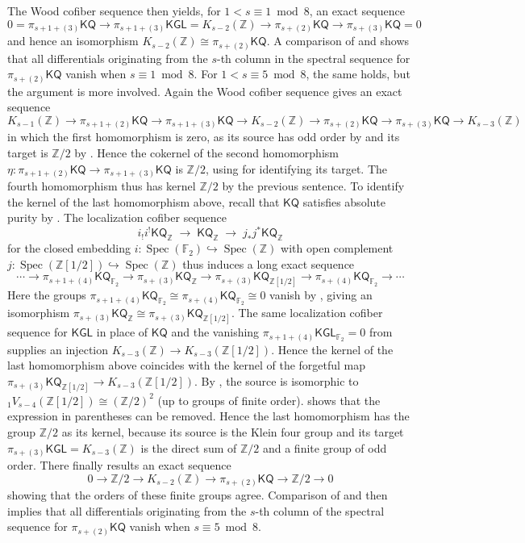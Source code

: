\documentclass[11pt,hyp,english]{article}
\newcommand{\Z}{\mathbb{Z}}
\newcommand{\FF}{\mathbb{F}}
\newcommand{\KGL}{\mathsf{KGL}}
\newcommand{\KQ}{\mathsf{KQ}}
\newcommand{\Spec}{\operatorname{Spec}}
\let\iso=\cong
\theoremstyle{definition}
\begin{document}
The Wood cofiber sequence then yields, for $1 < s \equiv 1 \bmod 8$, an exact sequence
\[
0 = \pi_{s+1+(3)} \KQ \longrightarrow \pi_{s+1+(3)} \KGL = K_{s-2}(\Z) \longrightarrow \pi_{s+(2)} \KQ \longrightarrow \pi_{s+(3)} \KQ = 0
\]
and hence an isomorphism
$K_{s-2}(\Z) \cong \pi_{s+(2)} \KQ$.
A comparison of  and  shows that all differentials originating from the $s$-th column in the spectral sequence for $\pi_{s+(2)} \KQ$ vanish when $s \equiv 1 \bmod 8$.
For $1 < s \equiv 5 \bmod 8$, the same holds, but the argument is more involved.
Again the Wood cofiber sequence gives an exact sequence
\[
K_{s-1}(\Z) \to \pi_{s+1+(2)}\KQ \to \pi_{s+1+(3)}\KQ \to K_{s-2}(\Z) \to \pi_{s+(2)}\KQ \to \pi_{s+(3)}\KQ \to K_{s-3}(\Z)
\]
in which the first homomorphism is zero, as its source has odd order by  and its target is $\Z/2$ by . 
Hence the cokernel of the second homomorphism $\eta\colon \pi_{s+1+(2)}\KQ \to \pi_{s+1+(3)}\KQ$ is $\Z/2$, using  for identifying its target. 
The fourth homomorphism thus has kernel $\Z/2$ by the previous sentence.
To identify the kernel of the last homomorphism above, recall that $\KQ$ satisfies absolute purity by \cite[Theorem 8.4.2]{chn}.
The localization cofiber sequence 
\[
i_!i^!\KQ_\Z \;\longrightarrow\; \KQ_\Z \;\longrightarrow\; j_\ast j^\ast \KQ_\Z 
\]
for the closed embedding $ i \colon \Spec(\FF_{2}) \hookrightarrow \Spec(\Z)$
with open complement 
$j \colon \Spec(\Z[1/2]) \hookrightarrow \Spec(\Z)$
thus induces a long exact sequence
\[ \dotsm \to \pi_{s+1+(4)}\KQ_{\FF_2}\to \pi_{s+(3)}\KQ_\Z\to \pi_{s+(3)}\KQ_{\Z[1/2]} \to \pi_{s+(4)}\KQ_{\FF_2}\to \dotsm \]
Here the groups $\pi_{s+1+(4)}\KQ_{\FF_2}\iso \pi_{s+(4)}\KQ_{\FF_2}\iso 0$ vanish by , giving an isomorphism $\pi_{s+(3)}\KQ_\Z\iso \pi_{s+(3)}\KQ_{\Z[1/2]}$.
The same localization cofiber sequence for $\KGL$ in place of $\KQ$ and the vanishing $\pi_{s+1+(4)}\KGL_{\FF_2}=0$ from \cite{quillen.finite} supplies an injection $K_{s-3}(\Z)\to K_{s-3}(\Z[1/2])$.
Hence the kernel of the last homomorphism above coincides with the kernel of the forgetful map $\pi_{s+(3)}\KQ_{\Z[1/2]}\to K_{s-3}(\Z[1/2])$.
By \cite[Theorem 1.4]{zbMATH05840069}, the source is isomorphic to ${}_{1}V_{s-4}(\Z[1/2])\iso (\Z/2)^2$ (up to groups of finite order).
 shows that the expression in parentheses can be removed.
Hence the last homomorphism has the group $\Z/2$ as its kernel, because its source is the Klein four group and its target $\pi_{s+(3)}\KGL=K_{s-3}(\Z)$ is the direct sum of $\Z/2$ and a finite group of odd order.
There finally results an exact sequence
\[
0 \to \Z/2 \to K_{s-2}(\Z) \to \pi_{s+(2)}\KQ \to \Z/2 \to 0
\]
showing that the orders of these finite groups agree. 
Comparison of  and  then implies that all differentials originating from the $s$-th column of the spectral sequence for $\pi_{s+(2)}\KQ$ vanish when $s \equiv 5 \bmod 8$.
\end{document}
